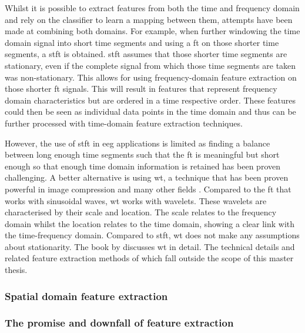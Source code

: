 Whilst it is possible to extract features from both the time and frequency domain and rely on the classifier to learn a mapping between them, attempts have been made at combining both domains.
For example, when further windowing the time domain signal into short time segments and using a \gls{ft} on those shorter time segments, a \gls{stft} is obtained.
\Gls{stft} assumes that those shorter time segments are stationary, even if the complete signal from which those time segments are taken was non-stationary.
This allows for using frequency-domain feature extraction on those shorter \gls{ft} signals.
This will result in features that represent frequency domain characteristics but are ordered in a time respective order.
These features could then be seen as individual data points in the time domain and thus can be further processed with time-domain feature extraction techniques.

However, the use of \gls{stft} in \gls{eeg} applications is limited as finding a balance between long enough time segments such that the \gls{ft} is meaningful but short enough so that enough time domain information is retained has been proven challenging.
A better alternative is using \gls{wt}, a technique that has been proven powerful in image compression and many other fields \citep{wavelet_transform_uses}.
Compared to the \gls{ft} that works with sinusoidal waves, \gls{wt} works with wavelets.
These wavelets are characterised by their scale and location.
The scale relates to the frequency domain whilst the location relates to the time domain, showing a clear link with the time-frequency domain.
Compared to \gls{stft}, \gls{wt} does not make any assumptions about stationarity.
The book by \citet{book_wavelet} discusses \gls{wt} in detail.
The technical details and related feature extraction methods of which fall outside the scope of this master thesis.


\subsubsection{Spatial domain feature extraction}
\label{subsubsec:processing_signals_general_pipeline_features_spatialdomain}




\subsubsection{The promise and downfall of feature extraction}
\label{subsubsec:processing_signals_general_pipeline_features_dl_link}

